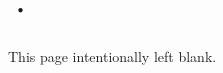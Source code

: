 \documentclass[book.tex]{subfiles}
\begin{document}
\section{·}

This page intentionally left blank.
\end{document}
